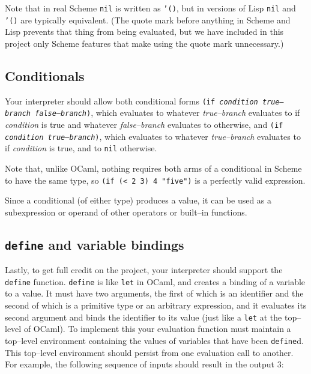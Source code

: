 \documentclass[11pt]{article}
\begin{document}
\begin{description}
                Note that in real Scheme \texttt{nil} is written as
                \texttt{'()}, but in versions of Lisp \texttt{nil} and
                \texttt{'()} are typically equivalent.  (The quote mark
                before anything in Scheme and Lisp prevents that thing from
                being evaluated, but we have included in this project only
                Scheme features that make using the quote mark unnecessary.)

        \end{description}

        \vspace{-2.5mm}

    \subsection{Conditionals}

      Your interpreter should allow both conditional forms \texttt{(if
    \emph{\textrm{condition}} \emph{\textrm{true--branch}}
    \emph{\textrm{false--branch}})}, which evaluates to whatever
    \emph{true--branch} evaluates to if \emph{condition} is true and
    whatever \emph{false--branch} evaluates to otherwise, and \texttt{(if
    \emph{\textrm{condition}} \emph{\textrm{true--branch}})}, which
    evaluates to whatever \emph{true--branch} evaluates to if
    \emph{condition} is true, and to \texttt{nil} otherwise.

      Note that, unlike OCaml, nothing requires both arms of a conditional in
    Scheme to have the same type, so \texttt{(if (< 2 3) 4 "five")} is a
    perfectly valid expression.

      Since a conditional (of either type) produces a value, it can be used as
    a subexpression or operand of other operators or built--in functions.

    \subsection{\texttt{define} and variable bindings}

      Lastly, to get full credit on the project, your interpreter should
    support the \texttt{define} function.  \texttt{define} is like
    \texttt{let} in OCaml, and creates a binding of a variable to a value.
    It must have two arguments, the first of which is an identifier and the
    second of which is a primitive type or an arbitrary expression, and it
    evaluates its second argument and binds the identifier to its value
    (just like a \texttt{let} at the top--level of OCaml).  To implement
    this your evaluation function must maintain a top--level environment
    containing the values of variables that have been \texttt{define}d.
    This top--level environment should persist from one evaluation call to
    another.  For example, the following sequence of inputs should result in
    the output 3:
\end{document}
